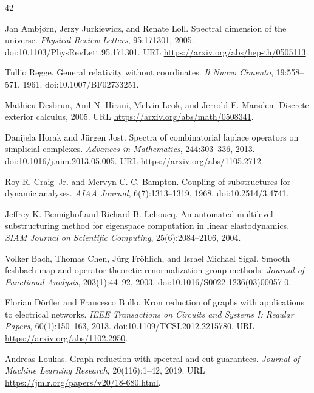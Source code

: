 \documentclass[11pt,letterpaper]{article}
\begin{document}
\renewcommand{\refname}{Prior-art references}
{}
\begin{thebibliography}{42}
\small

Jan Ambj\o rn, Jerzy Jurkiewicz, and Renate Loll.
Spectral dimension of the universe.
\emph{Physical Review Letters}, 95:171301, 2005.
doi:10.1103/PhysRevLett.95.171301.
URL \url{https://arxiv.org/abs/hep-th/0505113}.

Tullio Regge.
General relativity without coordinates.
\emph{Il Nuovo Cimento}, 19:558--571, 1961.
doi:10.1007/BF02733251.

Mathieu Desbrun, Anil N. Hirani, Melvin Leok, and Jerrold E. Marsden.
Discrete exterior calculus, 2005.
URL \url{https://arxiv.org/abs/math/0508341}.

Danijela Horak and J\"urgen Jost.
Spectra of combinatorial laplace operators on simplicial complexes.
\emph{Advances in Mathematics}, 244:303--336, 2013.
doi:10.1016/j.aim.2013.05.005.
URL \url{https://arxiv.org/abs/1105.2712}.

Roy R. Craig~Jr. and Mervyn C. C. Bampton.
Coupling of substructures for dynamic analyses.
\emph{AIAA Journal}, 6(7):1313--1319, 1968.
doi:10.2514/3.4741.

Jeffrey K. Bennighof and Richard B. Lehoucq.
An automated multilevel substructuring method for eigenspace computation in
linear elastodynamics.
\emph{SIAM Journal on Scientific Computing}, 25(6):2084--2106, 2004.

Volker Bach, Thomas Chen, J\"urg Fr\"ohlich, and Israel Michael Sigal.
Smooth feshbach map and operator-theoretic renormalization group methods.
\emph{Journal of Functional Analysis}, 203(1):44--92, 2003.
doi:10.1016/S0022-1236(03)00057-0.

Florian D\"orfler and Francesco Bullo.
Kron reduction of graphs with applications to electrical networks.
\emph{IEEE Transactions on Circuits and Systems I: Regular Papers},
60(1):150--163, 2013.
doi:10.1109/TCSI.2012.2215780.
URL \url{https://arxiv.org/abs/1102.2950}.

Andreas Loukas.
Graph reduction with spectral and cut guarantees.
\emph{Journal of Machine Learning Research}, 20(116):1--42, 2019.
URL \url{https://jmlr.org/papers/v20/18-680.html}.


\end{thebibliography}
\end{document}

